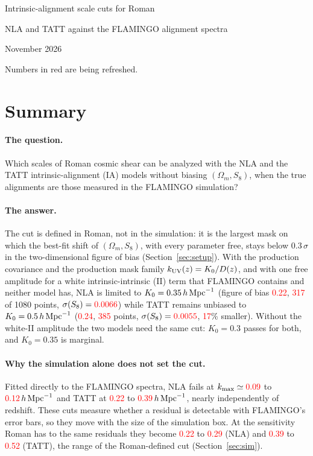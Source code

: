 \documentclass[11pt]{article}
\newcommand{\hMpc}{\,h\,{\rm Mpc}^{-1}}
\newcommand{\kmax}{k_{\rm max}}
\newcommand{\kuv}{k_{\rm UV}}
\newif\ifnumbersfinal
\newcommand{\refresh}[1]{\ifnumbersfinal#1\else\textcolor{red}{#1}\fi}
\newcommand{\SimNLAlo}{\refresh{0.09}}
\newcommand{\SimNLAhi}{\refresh{0.12}}
\newcommand{\SimTATTlo}{\refresh{0.22}}
\newcommand{\SimTATThi}{\refresh{0.39}}
\newcommand{\VolNLAlo}{\refresh{0.22}}
\newcommand{\VolNLAhi}{\refresh{0.29}}
\newcommand{\VolTATTlo}{\refresh{0.39}}
\newcommand{\VolTATThi}{\refresh{0.52}}
\newcommand{\ExNLAwFoB}{\refresh{0.22}}   %
\newcommand{\ExNLAwPts}{\refresh{317}}
\newcommand{\ExNLAwSig}{\refresh{0.0066}}
\newcommand{\ExTATTwFoB}{\refresh{0.24}}  %
\newcommand{\ExTATTwPts}{\refresh{385}}
\newcommand{\ExTATTwSig}{\refresh{0.0055}}
\newcommand{\ExGainSig}{\refresh{17}}     %
\newcommand{\Npts}{1080}
\newcommand{\Threshold}{0.3}
\begin{document}
\begin{center}
  {\LARGE Intrinsic-alignment scale cuts for Roman\par}
  \vspace{0.6em}
  {\large NLA and TATT against the FLAMINGO alignment spectra\par}
  \vspace{0.6em}
  {\large November 2026\par}
  \ifnumbersfinal\else
    \vspace{0.6em}
    {\color{red}Numbers in red are being refreshed.\par}
  \fi
\end{center}
\vspace{1em}

\section{Summary}
\label{sec:summary}

\paragraph{The question.}
Which scales of Roman cosmic shear can be analyzed with the NLA and
the TATT intrinsic-alignment (IA) models without biasing $(\Omega_m,
S_8)$, when the true alignments are those measured in the FLAMINGO
simulation?

\paragraph{The answer.}
The cut is defined in Roman, not in the simulation: it is the largest
mask on which the best-fit shift of $(\Omega_m, S_8)$, with every
parameter free, stays below $\Threshold\,\sigma$ in the two-dimensional
figure of bias (Section~\ref{sec:setup}). With the production
covariance and the production mask family $\kuv(z) = K_0/D(z)$, and
with one free amplitude for a white intrinsic-intrinsic (II) term that
FLAMINGO contains and neither model has, NLA is limited to $K_0 =
0.35\hMpc$ (figure of bias \ExNLAwFoB, \ExNLAwPts{} of \Npts{} points,
$\sigma(S_8) = \ExNLAwSig$) while TATT remains unbiased to $K_0 =
0.5\hMpc$ (\ExTATTwFoB, \ExTATTwPts{} points, $\sigma(S_8) =
\ExTATTwSig$, \ExGainSig\% smaller). Without the white-II amplitude
the two models need the same cut: $K_0 = 0.3$ passes for both, and
$K_0 = 0.35$ is marginal.

\paragraph{Why the simulation alone does not set the cut.}
Fitted directly to the FLAMINGO spectra, NLA fails at $\kmax \simeq
\SimNLAlo$ to $\SimNLAhi\hMpc$ and TATT at \SimTATTlo{} to
\SimTATThi$\hMpc$, nearly independently of redshift. These cuts measure
whether a residual is detectable with FLAMINGO's error bars, so they
move with the size of the simulation box. At the sensitivity Roman has
to the same residuals they become \VolNLAlo{} to \VolNLAhi{} (NLA) and
\VolTATTlo{} to \VolTATThi{} (TATT), the range of the Roman-defined
cut (Section~\ref{sec:sim}).
\end{document}

